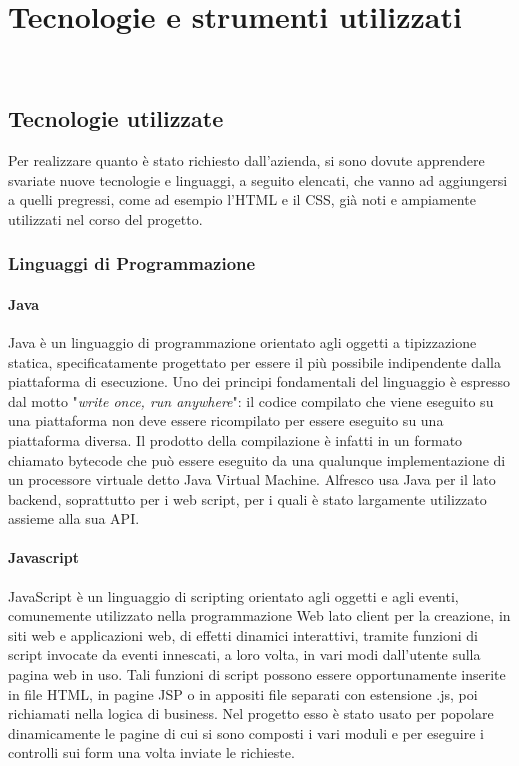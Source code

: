
\chapter{Tecnologie e strumenti utilizzati}
\label{cap:tecnologie-strumenti}

\\

\section{Tecnologie utilizzate}
Per realizzare quanto è stato richiesto dall'azienda, si sono dovute apprendere svariate nuove tecnologie e linguaggi, a seguito elencati, che vanno ad aggiungersi a quelli pregressi, come ad esempio l'HTML e il CSS, già noti e ampiamente utilizzati nel corso del progetto.
\subsection{Linguaggi di Programmazione}
\subsubsection{Java}
Java è un linguaggio di programmazione orientato agli oggetti a tipizzazione statica,
specificatamente progettato per essere il più possibile indipendente dalla piattaforma
di esecuzione. Uno dei principi fondamentali del linguaggio è espresso dal motto "\textit{write
once, run anywhere}": il codice compilato che viene eseguito su una piattaforma non
deve essere ricompilato per essere eseguito su una piattaforma diversa. Il prodotto
della compilazione è infatti in un formato chiamato bytecode che può essere eseguito da
una qualunque implementazione di un processore virtuale detto Java Virtual Machine.
Alfresco usa Java per il lato backend, soprattutto per i web script, per i quali è stato largamente utilizzato assieme alla sua \gls{API}.
\subsubsection{Javascript}
JavaScript è un linguaggio di scripting orientato agli oggetti e agli eventi, comunemente
utilizzato nella programmazione Web lato client per la creazione, in siti web e
applicazioni web, di effetti dinamici interattivi, tramite funzioni di script invocate da
eventi innescati, a loro volta, in vari modi dall’utente sulla pagina web in uso. Tali
funzioni di script possono essere opportunamente inserite in file HTML, in pagine JSP
o in appositi file separati con estensione .js, poi richiamati nella logica di business.
Nel progetto esso è stato usato per popolare dinamicamente le pagine di cui si sono composti i vari moduli e per eseguire i controlli sui form una volta inviate le richieste.
